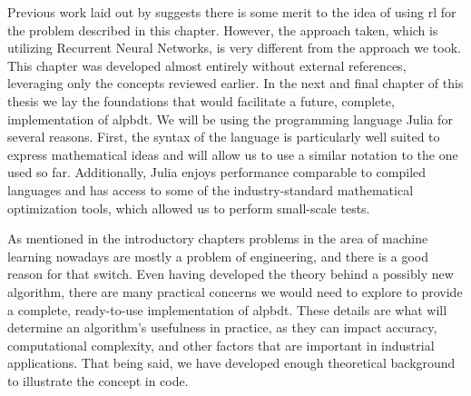 Previous work laid out by \citeauthor{xiong} suggests there is some merit to the
idea of using \ac{rl} for the problem described in this chapter. However, the
approach taken, which is utilizing Recurrent Neural Networks, is very different
from the approach we took. This chapter was developed almost entirely without
external references, leveraging only the concepts reviewed earlier. In the next
and final chapter of this thesis we lay the foundations that would facilitate a
future, complete, implementation of \ac{alpbdt}. We will be using the
programming language Julia for several reasons. First, the syntax of the
language is particularly well suited to express mathematical ideas and will
allow us to use a similar notation to the one used so far. Additionally, Julia
enjoys performance comparable to compiled languages and has access to some of
the industry-standard mathematical optimization tools, which allowed us to
perform small-scale tests.

As mentioned in the introductory chapters problems in the area of machine
learning nowadays are mostly a problem of engineering, and there is a good
reason for that switch. Even having developed the theory behind a possibly new
algorithm, there are many practical concerns we would need to explore to provide
a complete, ready-to-use implementation of \ac{alpbdt}. These details are what
will determine an algorithm's usefulness in practice, as they can impact
accuracy, computational complexity, and other factors that are important in
industrial applications. That being said, we have developed enough theoretical
background to illustrate the concept in code.
